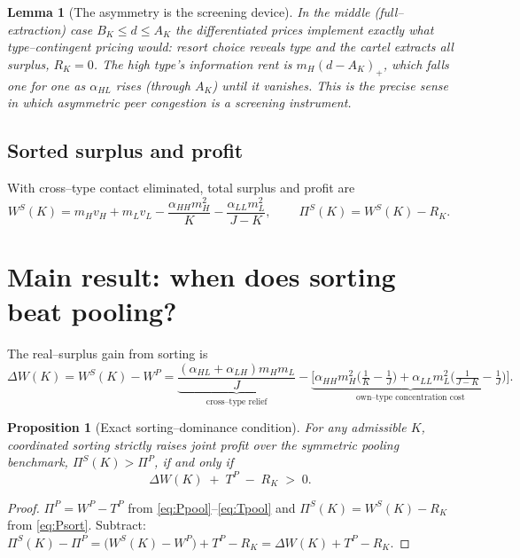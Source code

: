 \documentclass[11pt]{article}
\theoremstyle{plain}
\newtheorem{proposition}{Proposition}
\newtheorem{lemma}{Lemma}
\theoremstyle{definition}
\theoremstyle{remark}
\newcommand{\mH}{m_{H}}
\newcommand{\mL}{m_{L}}
\newcommand{\vH}{v_{H}}
\newcommand{\vL}{v_{L}}
\newcommand{\aHH}{\alpha_{HH}}
\newcommand{\aHL}{\alpha_{HL}}
\newcommand{\aLH}{\alpha_{LH}}
\newcommand{\aLL}{\alpha_{LL}}
\newcommand{\WP}{W^{P}}
\newcommand{\WS}{W^{S}}
\newcommand{\TP}{T^{P}}
\newcommand{\PiP}{\Pi^{P}}
\newcommand{\PiS}{\Pi^{S}}
\newcommand{\pos}[1]{\left(#1\right)_{+}}
\begin{document}
\begin{lemma}[The asymmetry is the screening device]\label{lem:screen}
In the middle (full--extraction) case $B_K\le d\le A_K$ the differentiated prices implement
exactly what type--contingent pricing would: resort choice reveals type and the cartel extracts
all surplus, $R_K=0$. The high type's information rent is $\mH\pos{d-A_K}$, which falls one for
one as $\aHL$ rises (through $A_K$) until it vanishes. This is the precise sense in which
asymmetric peer congestion is a screening instrument.
\end{lemma}

\subsection{Sorted surplus and profit}
With cross--type contact eliminated, total surplus and profit are
\begin{equation}
\WS(K)=\mH\vH+\mL\vL-\frac{\aHH\mH^2}{K}-\frac{\aLL\mL^2}{J-K},
\qquad
\boxed{\ \PiS(K)=\WS(K)-R_K. \ }
\label{eq:Psort}
\end{equation}

\section{Main result: when does sorting beat pooling?}\label{sec:main}

The real--surplus gain from sorting is
\begin{equation}
\Delta W(K)=\WS(K)-\WP
=\underbrace{\frac{(\aHL+\aLH)\mH\mL}{J}}_{\text{cross--type relief}}
-\underbrace{\Big[\aHH\mH^2\big(\tfrac1K-\tfrac1J\big)+\aLL\mL^2\big(\tfrac1{J-K}-\tfrac1J\big)\Big]}_{\text{own--type concentration cost}} .
\label{eq:dW}
\end{equation}

\begin{proposition}[Exact sorting--dominance condition]\label{prop:main}
For any admissible $K$, coordinated sorting strictly raises joint profit over the symmetric
pooling benchmark, $\PiS(K)>\PiP$, if and only if
\begin{equation}
\boxed{\ \Delta W(K) \;+\; \TP \;-\; R_K \;>\;0. \ }
\label{eq:maincond}
\end{equation}
\end{proposition}

\begin{proof}
$\PiP=\WP-\TP$ from \eqref{eq:Ppool}--\eqref{eq:Tpool} and $\PiS(K)=\WS(K)-R_K$ from
\eqref{eq:Psort}. Subtract: $\PiS(K)-\PiP=\big(\WS(K)-\WP\big)+\TP-R_K=\Delta W(K)+\TP-R_K$.
\end{proof}
\end{document}
